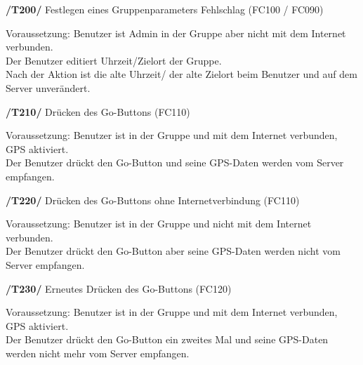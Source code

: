 \textbf{/T200/} Festlegen eines Gruppenparameters Fehlschlag (FC100 / FC090)\\
\begin{center}
\vspace{-\parskip}
\begin{minipage}[t]{0.9\textwidth}
Voraussetzung: Benutzer ist Admin in der Gruppe aber nicht mit dem Internet verbunden.\\
Der Benutzer editiert Uhrzeit/Zielort der Gruppe.                                      \\
Nach der Aktion ist die alte Uhrzeit/ der alte Zielort beim Benutzer und auf dem Server unverändert.\\
\end{minipage}
\end{center}

\textbf{/T210/} Drücken des Go-Buttons (FC110)\\
\begin{center}
\vspace{-\parskip}
\begin{minipage}[t]{0.9\textwidth}
Voraussetzung: Benutzer ist in der Gruppe und mit dem Internet verbunden, GPS aktiviert.\\
Der Benutzer drückt den Go-Button und seine GPS-Daten werden vom Server empfangen.       \\
\end{minipage}
\end{center}

\textbf{/T220/} Drücken des Go-Buttons ohne Internetverbindung (FC110)\\
\begin{center}
\vspace{-\parskip}
\begin{minipage}[t]{0.9\textwidth}
Voraussetzung: Benutzer ist in der Gruppe und nicht mit dem Internet verbunden.           \\
Der Benutzer drückt den Go-Button aber seine GPS-Daten werden nicht vom Server empfangen.  \\
\end{minipage}
\end{center}

\textbf{/T230/} Erneutes Drücken des Go-Buttons (FC120)\\
\begin{center}
\vspace{-\parskip}
\begin{minipage}[t]{0.9\textwidth}
Voraussetzung: Benutzer ist in der Gruppe und mit dem Internet verbunden, GPS aktiviert.    \\
Der Benutzer drückt den Go-Button ein zweites Mal und seine GPS-Daten werden nicht mehr vom Server empfangen.\\
\end{minipage}
\end{center}

